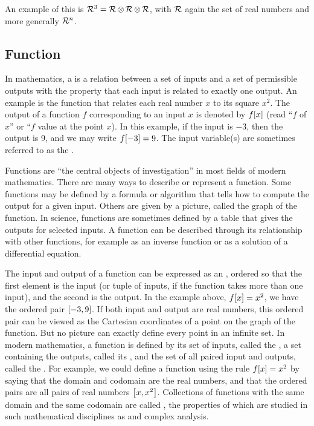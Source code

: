 An example of this is $\mathcal{R}^{3} = \mathcal{R}\operatorname{\otimes}\mathcal{R}\operatorname{\otimes}\mathcal{R}$, with $\mathcal{R}$ again the set of real numbers and more generally $\mathcal{R}^{n}$.


\subsection{Function}
In mathematics, a  is a relation between a set of inputs and a set of permissible outputs with the property that each input is related to exactly one output. An example is the function that relates each real number $x$ to its square $x^2$. The output of a function $f$ corresponding to an input $x$ is denoted by $f\!\left[{x}\right]$ (read ``$f$ of $x$'' or ``$f$ value at the point $x$). In this example, if the input is $-3$, then the output is 9, and we may write $f\!\left[{-3}\right] = 9$. The input variable(s) are sometimes referred to as the .

Functions are ``the central objects of investigation'' in most fields of modern mathematics. There are many ways to describe or represent a function. Some functions may be defined by a formula or algorithm that tells how to compute the output for a given input. Others are given by a picture, called the graph of the function. In science, functions are sometimes defined by a table that gives the outputs for selected inputs. A function can be described through its relationship with other functions, for example as an inverse function or as a solution of a differential equation.

The input and output of a function can be expressed as an , ordered so that the first element is the input (or tuple of inputs, if the function takes more than one input), and the second is the output. In the example above, $f\!\left[{x}\right] = x^2$, we have the ordered pair $\left[{-3,9}\right]$. If both input and output are real numbers, this ordered pair can be viewed as the Cartesian coordinates of a point on the graph of the function. But no picture can exactly define every point in an infinite set. In modern mathematics, a function is defined by its set of inputs, called the , a set containing the outputs, called its , and the set of all paired input and outputs, called the . For example, we could define a function using the rule $f\!\left[{x}\right] = x^2$ by saying that the domain and codomain are the real numbers, and that the ordered pairs are all pairs of real numbers $\left[{x,x^2}\right]$. Collections of functions with the same domain and the same codomain are called , the properties of which are studied in such mathematical disciplines as  and complex analysis.

